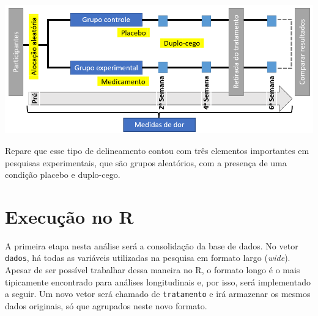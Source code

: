 \documentclass[
]{book}
\begin{document}
\includegraphics{./img/delineamento_experimental.png}

Repare que esse tipo de delineamento contou com três elementos importantes em pesquisas experimentais, que são grupos aleatórios, com a presença de uma condição placebo e duplo-cego.

\hypertarget{execuuxe7uxe3o-no-r-11}{%
\section{Execução no R}\label{execuuxe7uxe3o-no-r-11}}

A primeira etapa nesta análise será a consolidação da base de dados. No vetor \texttt{dados}, há todas as variáveis utilizadas na pesquisa em formato largo (\emph{wide}). Apesar de ser possível trabalhar dessa maneira no R, o formato longo é o mais tipicamente encontrado para análises longitudinais e, por isso, será implementado a seguir. Um novo vetor será chamado de \texttt{tratamento} e irá armazenar os mesmos dados originais, só que agrupados neste novo formato.
\end{document}
